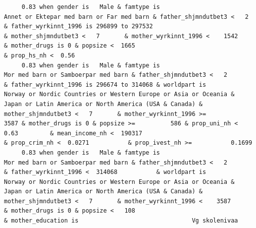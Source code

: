 \documentclass[
  letterpaper,
  DIV=11,
  numbers=noendperiod]{scrreprt}
\begin{document}
\begin{verbatim}
     0.83 when gender is   Male & famtype is                        Annet or Ektepar med barn or Far med barn & father_shjmndutbet3 <   2       & father_wyrkinnt_1996 is 296899 to 297532                                                                                                                                                    & mother_shjmndutbet3 <   7       & mother_wyrkinnt_1996 <    1542           & mother_drugs is 0 & popsize <  1665                                                                            & prop_hs_nh <  0.56                                                                                                                                                                                                                                                                                                                       
     0.83 when gender is   Male & famtype is                              Mor med barn or Samboerpar med barn & father_shjmndutbet3 <   2       & father_wyrkinnt_1996 is 296674 to 314068 & worldpart is            Norway or Nordic Countries or Western Europe or Asia or Oceania & Japan or Latin America or North America (USA & Canada) & mother_shjmndutbet3 <   7       & mother_wyrkinnt_1996 >=             3587 & mother_drugs is 0 & popsize >=          586 & prop_uni_nh <  0.63         & mean_income_nh <  190317                                        & prop_crim_nh <  0.0271           & prop_ivest_nh >=           0.1699                                                                                                                                                                                                                                        
     0.83 when gender is   Male & famtype is                              Mor med barn or Samboerpar med barn & father_shjmndutbet3 <   2       & father_wyrkinnt_1996 <  314068           & worldpart is            Norway or Nordic Countries or Western Europe or Asia or Oceania & Japan or Latin America or North America (USA & Canada) & mother_shjmndutbet3 <   7       & mother_wyrkinnt_1996 <    3587           & mother_drugs is 0 & popsize <   108                                                                                                                                                                                & mother_education is                                Vg skolenivaa                                                                                                                                                                     

\end{verbatim}
\end{document}

